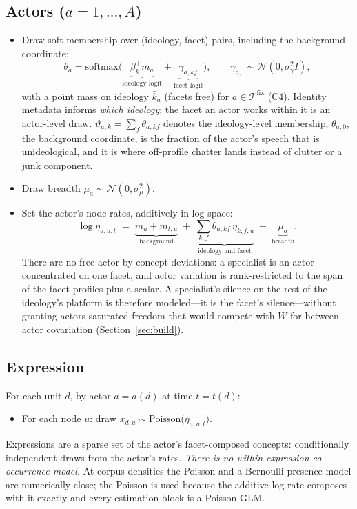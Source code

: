 \documentclass[11pt]{article}
\newcommand{\Tcal}{\mathcal{T}}
\newcommand{\1}{\mathbb{1}}
\begin{document}
\subsection*{Actors ($a=1,\dots,A$)}
\begin{itemize}
  \item Draw soft membership over (ideology, facet) pairs, including the background coordinate:
  \[
    \theta_a=\mathrm{softmax}\big(\underbrace{\beta_k^\top m_a}_{\text{ideology logit}}+\underbrace{\gamma_{a,kf}}_{\text{facet logit}}\big),\qquad
    \gamma_{a,\cdot}\sim\mathcal{N}(0,\sigma_\gamma^2 I),
  \]
  with a point mass on ideology $\bar k_a$ (facets free) for $a\in\Tcal^{\text{fix}}$ (C4). Identity metadata informs \emph{which ideology}; the facet an actor works within it is an actor-level draw. $\vartheta_{a,k}=\sum_f\theta_{a,kf}$ denotes the ideology-level membership; $\theta_{a,0}$, the background coordinate, is the fraction of the actor's speech that is unideological, and it is where off-profile chatter lands instead of clutter or a junk component.
  \item Draw breadth $\mu_a\sim\mathcal{N}(0,\sigma_\mu^2)$.
  \item Set the actor's node rates, additively in log space:
  \[
    \log\eta_{a,u,t}\;=\;\underbrace{m_u+m_{t,u}}_{\text{background}}\;+\;\underbrace{\textstyle\sum_{k,f}\theta_{a,kf}\,\eta_{k,f,u}}_{\text{ideology and facet}}\;+\;\underbrace{\mu_a}_{\text{breadth}}.
  \]
  There are no free actor-by-concept deviations: a specialist is an actor concentrated on one facet, and actor variation is rank-restricted to the span of the facet profiles plus a scalar. A specialist's silence on the rest of the ideology's platform is therefore modeled---it is the facet's silence---without granting actors saturated freedom that would compete with $W$ for between-actor covariation (Section~\ref{sec:build}).
\end{itemize}

\subsection*{Expression}
For each unit $d$, by actor $a=a(d)$ at time $t=t(d)$:
\begin{itemize}
  \item For each node $u$: draw $x_{d,u}\sim\text{Poisson}\big(\eta_{a,u,t}\big)$.
\end{itemize}
Expressions are a sparse set of the actor's facet-composed concepts: conditionally independent draws from the actor's rates. \emph{There is no within-expression co-occurrence model.} At corpus densities the Poisson and a Bernoulli presence model are numerically close; the Poisson is used because the additive log-rate composes with it exactly and every estimation block is a Poisson GLM.
\end{document}
